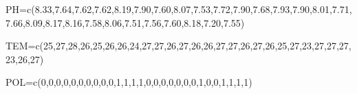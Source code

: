 \documentclass[
  letterpaper,
  DIV=11,
  numbers=noendperiod]{scrartcl}
\newenvironment{Shaded}{\begin{snugshade}}{\end{snugshade}}
\newcommand{\DecValTok}[1]{\textcolor[rgb]{0.68,0.00,0.00}{#1}}
\newcommand{\FloatTok}[1]{\textcolor[rgb]{0.68,0.00,0.00}{#1}}
\newcommand{\FunctionTok}[1]{\textcolor[rgb]{0.28,0.35,0.67}{#1}}
\newcommand{\NormalTok}[1]{\textcolor[rgb]{0.00,0.23,0.31}{#1}}
\newcommand{\OtherTok}[1]{\textcolor[rgb]{0.00,0.23,0.31}{#1}}
\begin{document}
\begin{Shaded}
\begin{Highlighting}[]
\NormalTok{PH}\OtherTok{=}\FunctionTok{c}\NormalTok{(}\FloatTok{8.33}\NormalTok{,}\FloatTok{7.64}\NormalTok{,}\FloatTok{7.62}\NormalTok{,}\FloatTok{7.62}\NormalTok{,}\FloatTok{8.19}\NormalTok{,}\FloatTok{7.90}\NormalTok{,}\FloatTok{7.60}\NormalTok{,}\FloatTok{8.07}\NormalTok{,}\FloatTok{7.53}\NormalTok{,}\FloatTok{7.72}\NormalTok{,}\FloatTok{7.90}\NormalTok{,}\FloatTok{7.68}\NormalTok{,}\FloatTok{7.93}\NormalTok{,}\FloatTok{7.90}\NormalTok{,}\FloatTok{8.01}\NormalTok{,}\FloatTok{7.71}\NormalTok{,}\FloatTok{7.66}\NormalTok{,}\FloatTok{8.09}\NormalTok{,}\FloatTok{8.17}\NormalTok{,}\FloatTok{8.16}\NormalTok{,}\FloatTok{7.58}\NormalTok{,}\FloatTok{8.06}\NormalTok{,}\FloatTok{7.51}\NormalTok{,}\FloatTok{7.56}\NormalTok{,}\FloatTok{7.60}\NormalTok{,}\FloatTok{8.18}\NormalTok{,}\FloatTok{7.20}\NormalTok{,}\FloatTok{7.55}\NormalTok{)}

\NormalTok{TEM}\OtherTok{=}\FunctionTok{c}\NormalTok{(}\DecValTok{25}\NormalTok{,}\DecValTok{27}\NormalTok{,}\DecValTok{28}\NormalTok{,}\DecValTok{26}\NormalTok{,}\DecValTok{25}\NormalTok{,}\DecValTok{26}\NormalTok{,}\DecValTok{26}\NormalTok{,}\DecValTok{24}\NormalTok{,}\DecValTok{27}\NormalTok{,}\DecValTok{27}\NormalTok{,}\DecValTok{26}\NormalTok{,}\DecValTok{27}\NormalTok{,}\DecValTok{26}\NormalTok{,}\DecValTok{26}\NormalTok{,}\DecValTok{27}\NormalTok{,}\DecValTok{27}\NormalTok{,}\DecValTok{26}\NormalTok{,}\DecValTok{27}\NormalTok{,}\DecValTok{26}\NormalTok{,}\DecValTok{25}\NormalTok{,}\DecValTok{27}\NormalTok{,}\DecValTok{23}\NormalTok{,}\DecValTok{27}\NormalTok{,}\DecValTok{27}\NormalTok{,}\DecValTok{27}\NormalTok{,}\DecValTok{23}\NormalTok{,}\DecValTok{26}\NormalTok{,}\DecValTok{27}\NormalTok{)}

\NormalTok{POL}\OtherTok{=}\FunctionTok{c}\NormalTok{(}\DecValTok{0}\NormalTok{,}\DecValTok{0}\NormalTok{,}\DecValTok{0}\NormalTok{,}\DecValTok{0}\NormalTok{,}\DecValTok{0}\NormalTok{,}\DecValTok{0}\NormalTok{,}\DecValTok{0}\NormalTok{,}\DecValTok{0}\NormalTok{,}\DecValTok{0}\NormalTok{,}\DecValTok{0}\NormalTok{,}\DecValTok{1}\NormalTok{,}\DecValTok{1}\NormalTok{,}\DecValTok{1}\NormalTok{,}\DecValTok{1}\NormalTok{,}\DecValTok{0}\NormalTok{,}\DecValTok{0}\NormalTok{,}\DecValTok{0}\NormalTok{,}\DecValTok{0}\NormalTok{,}\DecValTok{0}\NormalTok{,}\DecValTok{0}\NormalTok{,}\DecValTok{0}\NormalTok{,}\DecValTok{1}\NormalTok{,}\DecValTok{0}\NormalTok{,}\DecValTok{0}\NormalTok{,}\DecValTok{1}\NormalTok{,}\DecValTok{1}\NormalTok{,}\DecValTok{1}\NormalTok{,}\DecValTok{1}\NormalTok{)}
\end{Highlighting}
\end{Shaded}
\end{document}
